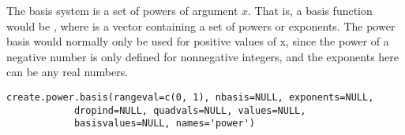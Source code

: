 \begin{Description}\relax
The basis system is a set of powers of argument $x$.  That is, a basis
function would be , where  is a vector
containing a set of powers or exponents.  The power basis would
normally only be used for positive values of x, since the power of a
negative number is only defined for nonnegative integers, and the
exponents here can be any real numbers.
\end{Description}
\begin{Usage}
\begin{verbatim}
create.power.basis(rangeval=c(0, 1), nbasis=NULL, exponents=NULL,
            dropind=NULL, quadvals=NULL, values=NULL,
            basisvalues=NULL, names='power')
\end{verbatim}
\end{Usage}
